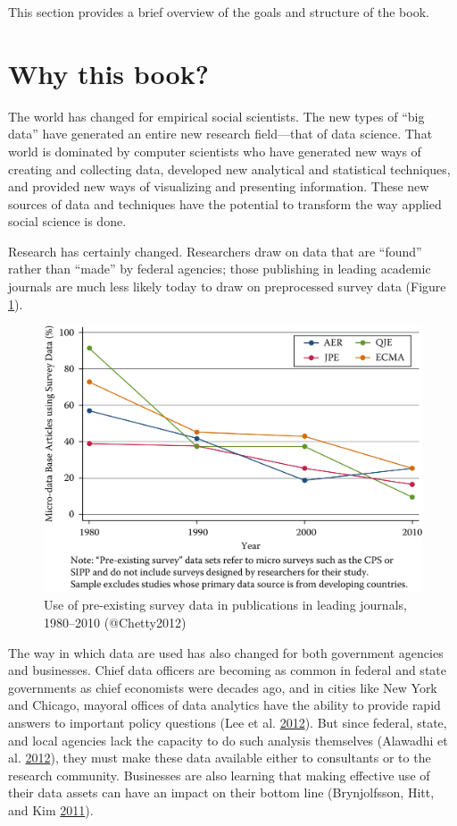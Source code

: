 \documentclass[]{krantz}
\begin{document}
This section provides a brief overview of the goals and structure of the
book.

\section{Why this book?}\label{sec:1-1}

The world has changed for empirical social scientists. The new types of
``big data'' have generated an entire new research field---that of data
science. That world is dominated by computer scientists who have
generated new ways of creating and collecting data, developed new
analytical and statistical techniques, and provided new ways of
visualizing and presenting information. These new sources of data and
techniques have the potential to transform the way applied social
science is done.

Research has certainly changed. Researchers draw on data that are
``found'' rather than ``made'' by federal agencies; those publishing in
leading academic journals are much less likely today to draw on
preprocessed survey data (Figure \ref{fig:fig1}).

\begin{figure}

{\centering \includegraphics[width=0.7\linewidth]{ChapterIntro/figures/Figure1} 

}

\caption{Use of pre-existing survey data in publications in leading journals, 1980--2010 (@Chetty2012)}\label{fig:fig1}
\end{figure}

The way in which data are used has also changed for both government
agencies and businesses. Chief data officers are becoming as common in
federal and state governments as chief economists were decades ago, and
in cities like New York and Chicago, mayoral offices of data analytics
have the ability to provide rapid answers to important policy questions
(Lee et al. \protect\hyperlink{ref-lee2012rise}{2012}). But since
federal, state, and local agencies lack the capacity to do such analysis
themselves (Alawadhi et al.
\protect\hyperlink{ref-alawadhi2012building}{2012}), they must make
these data available either to consultants or to the research community.
Businesses are also learning that making effective use of their data
assets can have an impact on their bottom line (Brynjolfsson, Hitt, and
Kim \protect\hyperlink{ref-brynjolfsson2011strength}{2011}).
\end{document}
